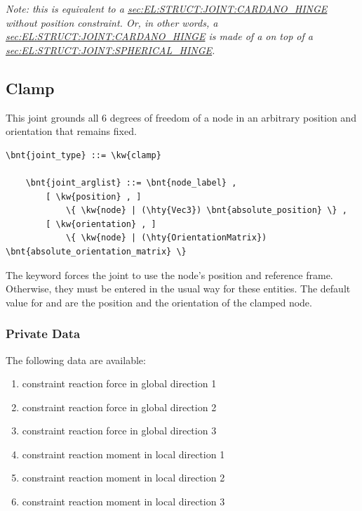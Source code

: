 \emph{Note: this is equivalent to a
\hyperref{\kw{cardano hinge}}{\kw{cardano hinge} (see Section~}{)}{sec:EL:STRUCT:JOINT:CARDANO_HINGE}
without position constraint.
Or, in other words, a 
\hyperref{\kw{cardano hinge}}{\kw{cardano hinge} (see Section~}{)}{sec:EL:STRUCT:JOINT:CARDANO_HINGE}
is made of a  on top of a 
\hyperref{\kw{spherical hinge}}{\kw{spherical hinge} (see Section~}{)}{sec:EL:STRUCT:JOINT:SPHERICAL_HINGE}.
}



\subsection{Clamp}
This joint grounds all 6 degrees of freedom of a node
in an arbitrary position and orientation that remains fixed.
\begin{Verbatim}[commandchars=\\\{\}]
    \bnt{joint_type} ::= \kw{clamp}

    \bnt{joint_arglist} ::= \bnt{node_label} ,
        [ \kw{position} , ]
            \{ \kw{node} | (\hty{Vec3}) \bnt{absolute_position} \} ,
        [ \kw{orientation} , ]
            \{ \kw{node} | (\hty{OrientationMatrix}) \bnt{absolute_orientation_matrix} \}
\end{Verbatim}
The keyword  forces the joint to use
the node's position and reference frame. Otherwise, they must be entered
in the usual way for these entities.
The default value for  and 
are the position and the orientation of the clamped node.

\subsubsection{Private Data}
The following data are available:
\begin{enumerate}
\item {} constraint reaction force in global direction 1
\item {} constraint reaction force in global direction 2
\item {} constraint reaction force in global direction 3
\item {} constraint reaction moment in local direction 1
\item {} constraint reaction moment in local direction 2
\item {} constraint reaction moment in local direction 3
\end{enumerate}




